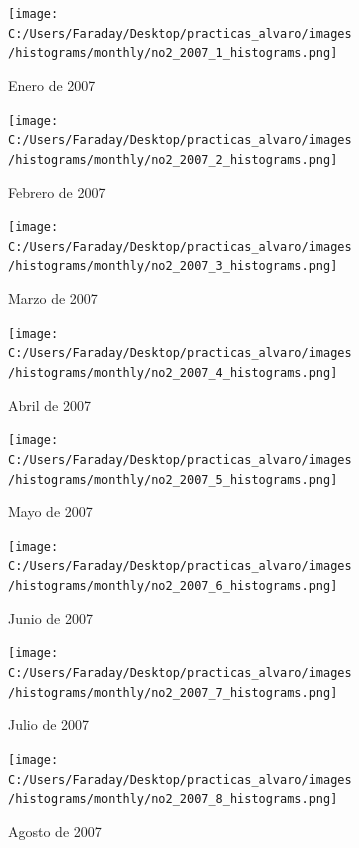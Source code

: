 \documentclass[12pt]{article}
\begin{document}
\begin{figure}[H]
\centering
\begin{subfigure}[h]{0.45\textwidth}
\texttt{[image: C:/Users/Faraday/Desktop/practicas\_alvaro/images/histograms/monthly/no2\_2007\_1\_histograms.png]}
\caption{Enero de 2007}
\label{fig:hist-mon-1-1-2007}
\end{subfigure}
%
\begin{subfigure}[H]{0.45\textwidth}
\texttt{[image: C:/Users/Faraday/Desktop/practicas\_alvaro/images/histograms/monthly/no2\_2007\_2\_histograms.png]}
\caption{Febrero de 2007}
\label{fig:hist-mon-1-2-2007}
\end{subfigure}
\caption{}
\end{figure}

\begin{figure}[H]
\centering
\begin{subfigure}[h]{0.45\textwidth}
\texttt{[image: C:/Users/Faraday/Desktop/practicas\_alvaro/images/histograms/monthly/no2\_2007\_3\_histograms.png]}
\caption{Marzo de 2007}
\label{fig:hist-mon-1-3-2007}
\end{subfigure}
%
\begin{subfigure}[H]{0.45\textwidth}
\texttt{[image: C:/Users/Faraday/Desktop/practicas\_alvaro/images/histograms/monthly/no2\_2007\_4\_histograms.png]}
\caption{Abril de 2007}
\label{fig:hist-mon-1-4-2007}
\end{subfigure}
\caption{}
\end{figure}

\begin{figure}[H]
\centering
\begin{subfigure}[h]{0.45\textwidth}
\texttt{[image: C:/Users/Faraday/Desktop/practicas\_alvaro/images/histograms/monthly/no2\_2007\_5\_histograms.png]}
\caption{Mayo de 2007}
\label{fig:hist-mon-1-5-2007}
\end{subfigure}
%
\begin{subfigure}[H]{0.45\textwidth}
\texttt{[image: C:/Users/Faraday/Desktop/practicas\_alvaro/images/histograms/monthly/no2\_2007\_6\_histograms.png]}
\caption{Junio de 2007}
\label{fig:hist-mon-1-6-2007}
\end{subfigure}
\caption{}
\end{figure}

\newpage

\begin{figure}[H]
\centering
\begin{subfigure}[h]{0.45\textwidth}
\texttt{[image: C:/Users/Faraday/Desktop/practicas\_alvaro/images/histograms/monthly/no2\_2007\_7\_histograms.png]}
\caption{Julio de 2007}
\label{fig:hist-mon-1-7-2007}
\end{subfigure}
%
\begin{subfigure}[H]{0.45\textwidth}
\texttt{[image: C:/Users/Faraday/Desktop/practicas\_alvaro/images/histograms/monthly/no2\_2007\_8\_histograms.png]}
\caption{Agosto de 2007}
\label{fig:hist-mon-1-8-2007}
\end{subfigure}
\caption{}
\end{figure}
\end{document}
